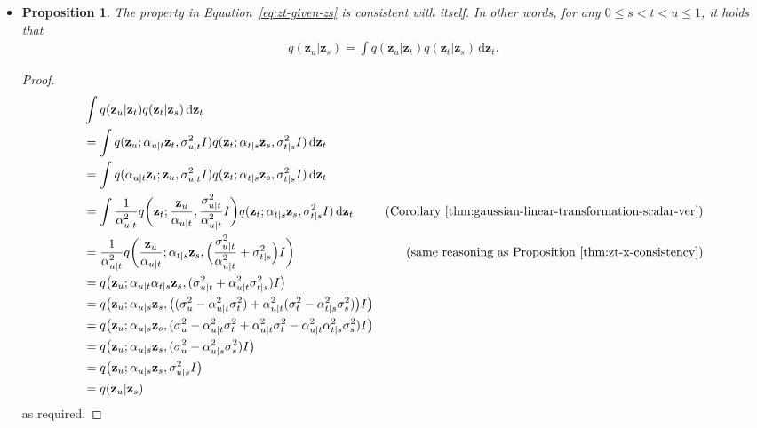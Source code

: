 \documentclass[10pt]{article}
\newtheorem{proposition}[lemma]{Proposition}
\newcommand{\dee}{\mathrm{d}}
\newcommand{\ve}[1]{\mathbf{#1}}
\begin{document}
\begin{itemize}
\pagebreak 
\item \begin{proposition}
  The property in Equation~\ref{eq:zt-given-zs} is consistent with itself. In other words, for any $0 \leq s < t < u \leq 1$, it holds that
  \begin{align*}
    q(\ve{z}_u|\ve{z}_s) = \int q(\ve{z}_u|\ve{z}_t) q(\ve{z}_t|\ve{z}_s)\, \dee \ve{z}_t.
  \end{align*}
\end{proposition}
\begin{proof}
\begin{align*}
  &\int q(\ve{z}_u|\ve{z}_t) q(\ve{z}_t|\ve{z}_s)\, \dee \ve{z}_t \\
  &= \int q(\ve{z}_u; \alpha_{u|t}\ve{z}_t, \sigma_{u|t}^2 I ) q(\ve{z}_t; \alpha_{t|s}\ve{z}_s, \sigma_{t|s}^2 I )\, \dee\ve{z}_t \\
  &= \int q(\alpha_{u|t}\ve{z}_t; \ve{z}_u, \sigma_{u|t}^2 I ) q(\ve{z}_t; \alpha_{t|s}\ve{z}_s, \sigma_{t|s}^2 I )\, \dee\ve{z}_t \\
  &= \int \frac{1}{\alpha_{u|t}^2} q\bigg(\ve{z}_t; \frac{\ve{z}_u}{\alpha_{u|t}}, \frac{\sigma_{u|t}^2}{\alpha_{u|t}^2} I \bigg) q(\ve{z}_t; \alpha_{t|s}\ve{z}_s, \sigma_{t|s}^2 I )\, \dee\ve{z}_t & (\mbox{Corollary~\ref{thm:gaussian-linear-transformation-scalar-ver}})\\
  &= \frac{1}{\alpha_{u|t}^2} q\bigg(\frac{\ve{z}_u}{\alpha_{u|t}}; \alpha_{t|s}\ve{z}_s, \Big( \frac{\sigma_{u|t}^2}{\alpha_{u|t}^2} + \sigma_{t|s}^2 \Big) I \bigg) & (\mbox{same reasoning as Proposition~\ref{thm:zt-x-consistency}})\\
  &= q\big(\ve{z}_u; \alpha_{u|t}\alpha_{t|s}\ve{z}_s, ( \sigma_{u|t}^2 + \alpha_{u|t}^2 \sigma_{t|s}^2 ) I \big)\\
  &= q\big(\ve{z}_u; \alpha_{u|s}\ve{z}_s, \big( (\sigma_u^2 - \alpha_{u|t}^2 \sigma_t^2) + \alpha_{u|t}^2 (\sigma_t^2 - \alpha_{t|s}^2 \sigma_s^2) \big) I \big) \\
  &= q\big(\ve{z}_u; \alpha_{u|s}\ve{z}_s, ( \sigma_u^2 - \alpha_{u|t}^2 \sigma_t^2 + \alpha_{u|t}^2 \sigma_t^2 - \alpha_{u|t}^2 \alpha_{t|s}^2 \sigma_s^2) I \big) \\
  &= q\big(\ve{z}_u; \alpha_{u|s}\ve{z}_s, ( \sigma_u^2 - \alpha_{u|s}^2 \sigma_s^2) I \big) \\
  &= q\big(\ve{z}_u; \alpha_{u|s}\ve{z}_s, \sigma_{u|s}^2 I \big) \\
  &= q(\ve{z}_u|\ve{z}_s)
\end{align*}
as required.
\end{proof}


\end{itemize}
\end{document}
